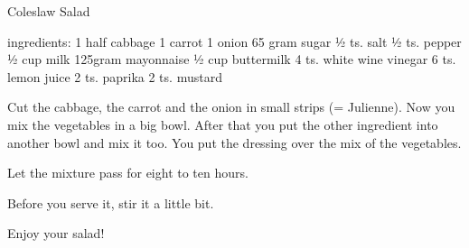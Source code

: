Coleslaw Salad

ingredients:	1		half cabbage
		1		carrot
		1		onion
		65 gram	sugar
½ ts.		salt
		½ ts.		pepper
		½ cup		milk
		125gram	mayonnaise
		½ cup		buttermilk
		4 ts.		 white wine vinegar
		6 ts.		lemon juice
		2 ts.		paprika
		2 ts.		mustard

Cut the cabbage, the carrot and the onion in small strips (= Julienne).
Now you mix the vegetables in a big bowl.
After that you put the other ingredient into another bowl and mix it too.
You put the dressing over the mix of the vegetables.

Let the mixture pass for eight to ten hours.

Before you serve it, stir it a little bit.

Enjoy your salad!
